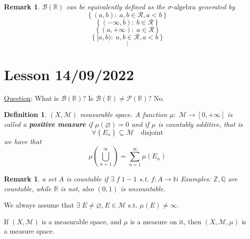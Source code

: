 \documentclass[a4paper,12pt]{article}
\theoremstyle{break}
\newtheorem{remark}[section]{Remark}
\newtheorem{definition}{Definition}[section]
\let\emptyset\varnothing
\newcommand{\sigalg}{\sigma\mbox{-algebra}}
\newcommand{\boreal}{\mathcal{B}(\mathbb{R})}
\numberwithin{equation}{section}
\begin{document}
\begin{remark}
    \(\mathcal{B}(\mathbb{R})\) can be equivalently defined as the \(\sigalg\) generated by 
    \[
        \left\lbrace (a,b): \; a,b \in \mathcal{R}, a < b \right\rbrace
    \]
    \[
        \left\lbrace (-\infty,b): \; b \in \mathcal{R} \right\rbrace
    \]
    \[
        \left\lbrace (a,+\infty ): \; a \in \mathcal{R} \right\rbrace
    \]
    \[
        \left\lbrace [a,b): \; a,b \in \mathcal{R}, a < b \right\rbrace
    \]
    \[
        \vdots
    \]
\end{remark}
\section{Lesson 14/09/2022}
\underline{Question}: What is \(\boreal\)?
Is \(\boreal \not = \mathcal{P}(\mathbb{R})\)? No.
\begin{definition}
    \((X, \mathcal{M})\) measurable space. A function \(\mu : \; \mathcal{M} \to [0, +\infty]\) is called a \textbf{positive measure} if \(\mu(\emptyset) = 0\) and if \(\mu\) is countably additive, that is 
    \[
        \forall \left\lbrace E_n \right\rbrace \subseteq \mathcal{M} \quad \mbox{disjoint}
    \]
    we have that \[
        \mu\left(\bigcup_{n=1}^{\infty}\right) = \sum_{n = 1}^{\infty} \mu(E_n) \tag*{\(\sigma\)-additivity}
    \]
\end{definition}
\begin{remark}
    a set \(A\) is countable if \(\exists \; f \; 1-1\) s.t. \(f: A\to \mathbb{N}\)
Examples: \(\mathbb{Z}, \mathbb{Q}\) are countable, while \(\mathbb{R}\) is not, also \((0,1)\) is uncountable.
\end{remark}
We always assume that \(\exists \; E \not = \emptyset, E \in \mathcal{M}\) s.t. \(\mu(E) \not = \infty\). 

If \((X,\mathcal{M})\) is a measurable space, and \(\mu\) is a measure on it, then \((X, \mathcal{M}, \mu)\) is a measure space.
\end{document}
